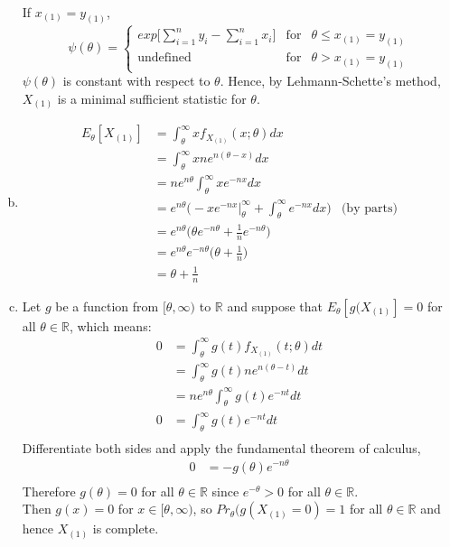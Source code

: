\documentclass[a4paper,11pt]{article}
\begin{document}
\begin{enumerate}[(a)]
		\\If $x_{(1)} = y_{(1)}$,
		\[
		\psi (\theta) = 
		\left\{ 
			\begin{array}{rcl}
			exp \bigg [ \sum^n_{i=1}y_i-\sum^n_{i=1}x_i \bigg ] & \mbox{for}
			& \theta \le x_{(1)} = y_{(1)} \\
			\mbox{undefined} & \mbox{for}  & \theta> x_{(1)}  = y_{(1)}
			\end{array}\right.
		\]
		$\psi (\theta)$ is constant with respect to $\theta$. Hence, by Lehmann-Schette's method, $X_{(1)}$ is a minimal sufficient statistic for $\theta$.
	\item
		\begin{align*}
		E_{\theta}[X_{(1)}] &= \int^\infty_\theta xf_{X_{(1)}}(x;\theta) dx \\
		&= \int^\infty_\theta x ne^{n(\theta-x)} dx \\
		&= ne^{n\theta}\int^\infty_\theta  x e^{-nx} dx\\
		&= e^{n\theta}\bigg( -xe^{-nx} \bigg|^\infty_\theta + \int^\infty_\theta e^{-nx}dx  \bigg) & \mbox{(by parts)}\\
		&= e^{n\theta}\bigg( \theta e^{-n\theta} + \frac{1}{n} e^{-n\theta}  \bigg)\\
		&= e^{n\theta}e^{-n\theta}\bigg( \theta +\frac{1}{n} \bigg)\\
		&= \theta +\frac{1}{n} 
		\end{align*}
	\item
		Let $g$ be a function from $[\theta,\infty)$ to $\mathbb{R}$ and suppose that $ E_{\theta}[g(X_{(1)}] = 0$ for all $\theta \in \mathbb{R}$, which means:
		\begin{align*}
		0&=\int^\infty_\theta g(t)f_{X_{(1)}}(t;\theta)dt\\
		&=\int^\infty_\theta g(t)ne^{n(\theta-t)}dt\\
		&=ne^{n\theta}\int^\infty_\theta g(t)e^{-nt}dt\\
		0&=\int^\infty_\theta g(t)e^{-nt}dt\\
		\end{align*}
		Differentiate both sides and apply the fundamental theorem of calculus,
		\begin{align*}
		0&=-g(\theta)e^{-n\theta} \\
		\end{align*}
		Therefore $g(\theta) = 0 $ for all $\theta \in \mathbb{R}$ since $e^{-\theta} >0$  for all $\theta \in \mathbb{R}$.
		\\Then   $g(x) = 0 $ for $x\in [\theta,\infty)$, so $Pr_{\theta}(g(X_{(1)}=0)=1$ for all $\theta \in \mathbb{R}$ and hence $X_{(1)}$ is complete.

\end{enumerate}
\end{document}
